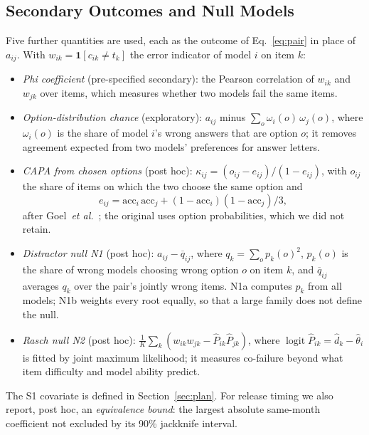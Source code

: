 \documentclass{ieeeaccess}
\theoremstyle{definition}
\theoremstyle{plain}
\begin{document}
\subsection{Secondary Outcomes and Null Models}
\label{sec:defs}
Five further quantities are used, each as the outcome of Eq.~\eqref{eq:pair} in place of $a_{ij}$. With $w_{ik} = \mathbf{1}[c_{ik} \neq t_k]$ the error indicator of model $i$ on item $k$:
\begin{itemize}
\item \emph{Phi coefficient} (pre-specified secondary): the Pearson correlation of $w_{ik}$ and $w_{jk}$ over items, which measures whether two models fail the same items.
\item \emph{Option-distribution chance} (exploratory): $a_{ij}$ minus $\sum_o \omega_i(o)\,\omega_j(o)$, where $\omega_i(o)$ is the share of model $i$'s wrong answers that are option $o$; it removes agreement expected from two models' preferences for answer letters.
\item \emph{CAPA from chosen options} (post hoc): $\kappa_{ij} = (o_{ij} - e_{ij})/(1 - e_{ij})$, with $o_{ij}$ the share of items on which the two choose the same option and
\[ e_{ij} = \mathrm{acc}_i\,\mathrm{acc}_j + (1-\mathrm{acc}_i)(1-\mathrm{acc}_j)/3, \]
after Goel~\textit{et al.}~\cite{goel2025}; the original uses option probabilities, which we did not retain.
\item \emph{Distractor null N1} (post hoc): $a_{ij} - \overline{q}_{ij}$, where $q_k = \sum_o p_k(o)^2$, $p_k(o)$ is the share of wrong models choosing wrong option $o$ on item $k$, and $\overline{q}_{ij}$ averages $q_k$ over the pair's jointly wrong items. N1a computes $p_k$ from all models; N1b weights every root equally, so that a large family does not define the null.
\item \emph{Rasch null N2} (post hoc): $\frac{1}{K}\sum_k (w_{ik}w_{jk} - \hat P_{ik}\hat P_{jk})$, where $\operatorname{logit} \hat P_{ik} = \hat d_k - \hat\theta_i$ is fitted by joint maximum likelihood; it measures co-failure beyond what item difficulty and model ability predict.
\end{itemize}
The S1 covariate is defined in Section~\ref{sec:plan}. For release timing we also report, post hoc, an \emph{equivalence bound}: the largest absolute same-month coefficient not excluded by its 90\% jackknife interval.
\end{document}

